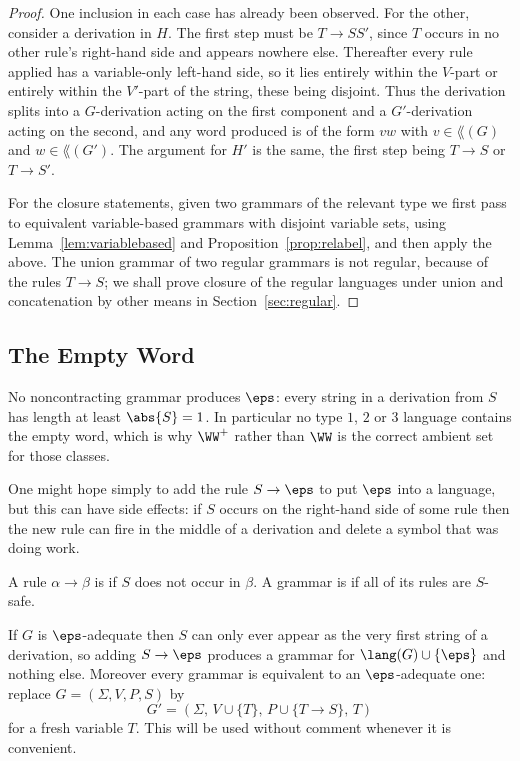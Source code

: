 \begin{proof}
	One inclusion in each case has already been observed. For the other, consider a derivation in $H$. The first step must be $T \to SS'$, since $T$ occurs in no other rule's right-hand side and appears nowhere else. Thereafter every rule applied has a variable-only left-hand side, so it lies entirely within the $V$-part or entirely within the $V'$-part of the string, these being disjoint. Thus the derivation splits into a $G$-derivation acting on the first component and a $G'$-derivation acting on the second, and any word produced is of the form $vw$ with $v \in \lang(G)$ and $w \in \lang(G')$. The argument for $H'$ is the same, the first step being $T \to S$ or $T \to S'$.

	For the closure statements, given two grammars of the relevant type we first pass to equivalent variable-based grammars with disjoint variable sets, using Lemma~\ref{lem:variablebased} and Proposition~\ref{prop:relabel}, and then apply the above. The union grammar of two regular grammars is not regular, because of the rules $T \to S$; we shall prove closure of the regular languages under union and concatenation by other means in Section~\ref{sec:regular}.
\end{proof}

\subsection{The Empty Word}

\begin{remark}
	No noncontracting grammar produces $\eps$: every string in a derivation from $S$ has length at least $\abs{S} = 1$. In particular no type $1$, $2$ or $3$ language contains the empty word, which is why $\WW^+$ rather than $\WW$ is the correct ambient set for those classes.
\end{remark}

One might hope simply to add the rule $S \to \eps$ to put $\eps$ into a language, but this can have side effects: if $S$ occurs on the right-hand side of some rule then the new rule can fire in the middle of a derivation and delete a symbol that was doing work.

\begin{definition}
	A rule $\alpha \to \beta$ is  if $S$ does not occur in $\beta$. A grammar is  if all of its rules are $S$-safe.
\end{definition}

If $G$ is $\eps$-adequate then $S$ can only ever appear as the very first string of a derivation, so adding $S \to \eps$ produces a grammar for $\lang(G) \cup \{\eps\}$ and nothing else. Moreover every grammar is equivalent to an $\eps$-adequate one: replace $G = (\Sigma, V, P, S)$ by
$$G' = (\Sigma,\, V \cup \{T\},\, P \cup \{T \to S\},\, T)$$
for a fresh variable $T$. This will be used without comment whenever it is convenient.

